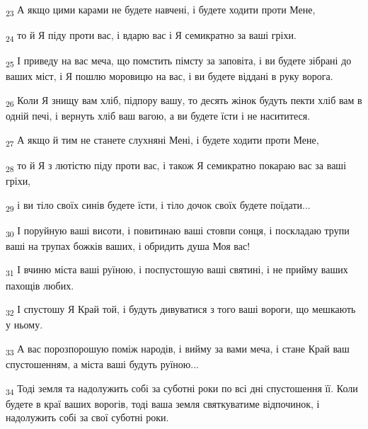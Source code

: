 \begin{tcolorbox}
\textsubscript{23} А якщо цими карами не будете навчені, і будете ходити проти Мене,
\end{tcolorbox}
\begin{tcolorbox}
\textsubscript{24} то й Я піду проти вас, і вдарю вас і Я семикратно за ваші гріхи.
\end{tcolorbox}
\begin{tcolorbox}
\textsubscript{25} І приведу на вас меча, що помстить пімсту за заповіта, і ви будете зібрані до ваших міст, і Я пошлю моровицю на вас, і ви будете віддані в руку ворога.
\end{tcolorbox}
\begin{tcolorbox}
\textsubscript{26} Коли Я знищу вам хліб, підпору вашу, то десять жінок будуть пекти хліб вам в одній печі, і вернуть хліб ваш вагою, а ви будете їсти і не насититеся.
\end{tcolorbox}
\begin{tcolorbox}
\textsubscript{27} А якщо й тим не станете слухняні Мені, і будете ходити проти Мене,
\end{tcolorbox}
\begin{tcolorbox}
\textsubscript{28} то й Я з лютістю піду проти вас, і також Я семикратно покараю вас за ваші гріхи,
\end{tcolorbox}
\begin{tcolorbox}
\textsubscript{29} і ви тіло своїх синів будете їсти, і тіло дочок своїх будете поїдати...
\end{tcolorbox}
\begin{tcolorbox}
\textsubscript{30} І поруйную ваші висоти, і повитинаю ваші стовпи сонця, і поскладаю трупи ваші на трупах божків ваших, і обридить душа Моя вас!
\end{tcolorbox}
\begin{tcolorbox}
\textsubscript{31} І вчиню міста ваші руїною, і поспустошую ваші святині, і не прийму ваших пахощів любих.
\end{tcolorbox}
\begin{tcolorbox}
\textsubscript{32} І спустошу Я Край той, і будуть дивуватися з того ваші вороги, що мешкають у ньому.
\end{tcolorbox}
\begin{tcolorbox}
\textsubscript{33} А вас порозпорошую поміж народів, і вийму за вами меча, і стане Край ваш спустошенням, а міста ваші будуть руїною...
\end{tcolorbox}
\begin{tcolorbox}
\textsubscript{34} Тоді земля та надолужить собі за суботні роки по всі дні спустошення її. Коли будете в краї ваших ворогів, тоді ваша земля святкуватиме відпочинок, і надолужить собі за свої суботні роки.
\end{tcolorbox}
